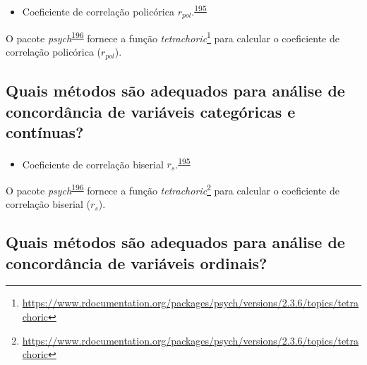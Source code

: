 \documentclass[
  a4paper,
]{book}
\providecommand{\tightlist}{%
  \setlength{\itemsep}{0pt}\setlength{\parskip}{0pt}}
\renewcommand{\href}[2]{#2\footnote{\url{#1}}}
\newenvironment{infobox}[1]
  {
  \begin{itemize}
  \renewcommand{\labelitemi}{
    \raisebox{-.7\height}[0pt][0pt]{
      {\setkeys{Gin}{width=3em,keepaspectratio}
        \texttt{[image: \#1]}}
    }
  }
  \setlength{\fboxsep}{1em}
  \begin{blackbox}
  \item
  }
  {
  \end{blackbox}
  \end{itemize}
  }
\begin{document}
\begin{itemize}
\tightlist
\item
  Coeficiente de correlação policórica \(r_{pol}\).\textsuperscript{\protect\hyperlink{ref-banerjee1999}{195}}
\end{itemize}

\begin{infobox}{images/Rlogo}
O pacote \emph{psych}\textsuperscript{\protect\hyperlink{ref-psych}{196}} fornece a função \href{https://www.rdocumentation.org/packages/psych/versions/2.3.6/topics/tetrachoric}{\emph{tetrachoric}} para calcular o coeficiente de correlação policórica (\(r_{pol}\)).

\end{infobox}

\hypertarget{quais-muxe9todos-suxe3o-adequados-para-anuxe1lise-de-concorduxe2ncia-de-variuxe1veis-categuxf3ricas-e-contuxednuas}{%
\subsection{Quais métodos são adequados para análise de concordância de variáveis categóricas e contínuas?}\label{quais-muxe9todos-suxe3o-adequados-para-anuxe1lise-de-concorduxe2ncia-de-variuxe1veis-categuxf3ricas-e-contuxednuas}}

\begin{itemize}
\tightlist
\item
  Coeficiente de correlação biserial \(r_{s}\).\textsuperscript{\protect\hyperlink{ref-banerjee1999}{195}}
\end{itemize}

\begin{infobox}{images/Rlogo}
O pacote \emph{psych}\textsuperscript{\protect\hyperlink{ref-psych}{196}} fornece a função \href{https://www.rdocumentation.org/packages/psych/versions/2.3.6/topics/tetrachoric}{\emph{tetrachoric}} para calcular o coeficiente de correlação biserial (\(r_{s}\)).

\end{infobox}

\hypertarget{quais-muxe9todos-suxe3o-adequados-para-anuxe1lise-de-concorduxe2ncia-de-variuxe1veis-ordinais}{%
\subsection{Quais métodos são adequados para análise de concordância de variáveis ordinais?}\label{quais-muxe9todos-suxe3o-adequados-para-anuxe1lise-de-concorduxe2ncia-de-variuxe1veis-ordinais}}
\end{document}
